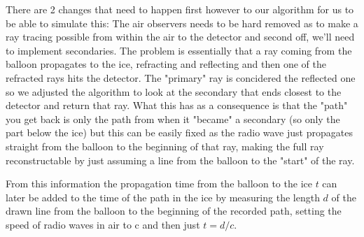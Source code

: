 \documentclass[11pt,a4paper,faculty=we,language=en,doctype=report]{cls/ugent-doc}
\begin{document}
There are 2 changes that need to happen first however to our algorithm for us to
be able to simulate this: The air observers needs to be hard removed
as to make a ray tracing possible from within the air to the
detector and second off, we'll need to implement secondaries.
The problem is essentially that a ray coming from the balloon 
propagates to the ice, refracting and reflecting and then one 
of the refracted rays hits the detector. 
The "primary" ray is concidered the reflected one 
so we adjusted the algorithm to look at the secondary that ends
closest to the detector and return that ray. What this has as
a consequence is that the "path" you get back is only the path
from when it "became" a secondary (so only the part below the ice)
but this can be easily fixed as the radio wave just propagates
straight from the balloon to the beginning of that ray,  making 
the full ray reconstructable by just assuming a line from the 
balloon to the "start" of the ray.

From this information the propagation time from the balloon to the ice $t$ 
can later be added to the time of the path in the ice by measuring the 
length $d$ of the drawn line from the balloon to the beginning of the recorded path, 
setting the speed of radio waves in air to c and then just $t = d/c$.
\end{document}
